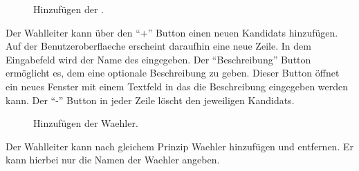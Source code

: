 \documentclass[parskip=full,11pt,twoside]{scrartcl}
\begin{document}
\begin{figure}[H]
	\caption{\label{fig:wlltr-candidate}
		Hinzufügen der .
	}
\end{figure}
Der \gls{Wahlleiter} kann über den \enquote{+} Button einen neuen \glspl{Kandidat} hinzufügen. Auf der \gls{Benutzeroberflaeche} erscheint daraufhin eine neue Zeile. In dem Eingabefeld wird der Name des  eingegeben. Der \enquote{Beschreibung} Button ermöglicht es, dem  eine optionale Beschreibung zu geben. Dieser Button öffnet ein neues Fenster mit einem Textfeld in das die Beschreibung eingegeben werden kann.
Der \enquote{-} Button in jeder Zeile löscht den jeweiligen \glspl{Kandidat}.


\begin{figure}[H]
	\caption{\label{fig:wlltr-voter}
		Hinzufügen der \gls{Waehler}.
	}
\end{figure}
Der \gls{Wahlleiter} kann nach gleichem Prinzip \gls{Waehler} hinzufügen und entfernen.
Er kann hierbei nur die Namen der \gls{Waehler} angeben.
\end{document}
